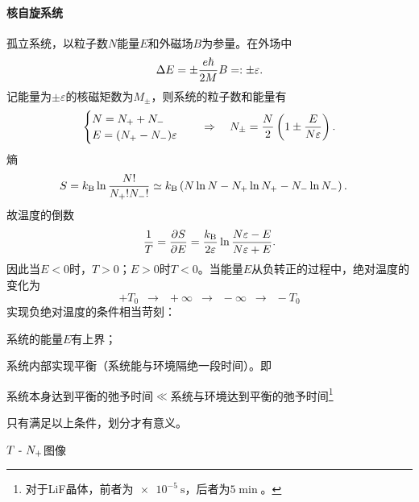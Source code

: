 \paragraph*{核自旋系统}孤立系统，以粒子数$N$能量$E$和外磁场$B$为参量。在外场中
\[
	\Delta E=\pm\frac{e\hbar}{2M}B=:\pm\varepsilon.
\]
记能量为$\pm\varepsilon$的核磁矩数为$M_\pm$，则系统的粒子数和能量有
\begin{align*}
	\begin{cases}
		N=N_++N_- \\
		E=(N_+-N_-)\varepsilon
	\end{cases}\quad\Rightarrow\quad
	N_\pm=\frac N2\left(1\pm\frac E{N\varepsilon}\right).
\end{align*}
熵
\begin{align*}
	S & =k_{\mathrm B}\ln\frac{N!}{N_+!N_-!}\simeq k_{\mathrm B}\left(N\ln N-N_+\ln N_+-N_-\ln N_-\right).
\end{align*}
故温度的倒数
\begin{align}
	\frac 1T=\frac{\partial^{\;\!\!}S}{\partial E^{\;\!\!}}=\frac{k_{\mathrm B}}{2\varepsilon}\ln\frac{N\varepsilon-E}{N\varepsilon+E}.
\end{align}
因此当$E<0$时，$T>0$；$E>0$时$T<0$。当能量$E$从负转正的过程中，绝对温度的变化为
\[
	+T_0\enspace\longrightarrow\enspace+\infty\enspace\to\enspace -\infty\enspace\longrightarrow\enspace-T_0
\]
实现负绝对温度的条件相当苛刻：
\begin{compactenum}
	\item 系统的能量$E$有上界；
	\item 系统内部实现平衡（系统能与环境隔绝一段时间）。即

	      系统本身达到平衡的弛予时间$\ll$系统与环境达到平衡的弛予时间\footnote{对于LiF晶体，前者为$\SI{e-5}\s$，后者为$\SI{5}\min$。}
\end{compactenum}
只有满足以上条件，划分才有意义。
\begin{center}
	\tikzchap $T~\text{-}~ N_+$图像
\end{center}
\clearpage
